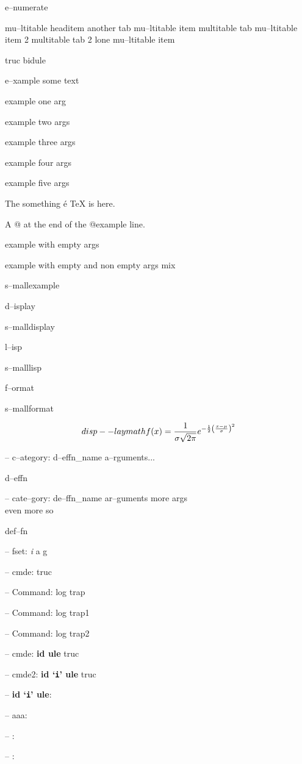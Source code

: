 \documentclass{book}
\begin{document}
e--numerate

mu--ltitable headitem another tab
mu--ltitable item multitable tab
mu--ltitable item 2 multitable tab 2
lone mu--ltitable item

truc bidule

e--xample  some
   text

example one arg

example two args

example three args

example four args

example five args

The something \'{e} \TeX{} is here.

A @ at the end of the @example line.

example with empty args

example with empty and non empty args mix

s--mallexample

d--isplay

s--malldisplay

l--isp

s--malllisp

f--ormat

s--mallformat

$$
disp--laymath
f(x) = {1 \over \sigma \sqrt{2\pi}}e^{-{1 \over 2}\left({x-\mu \over \sigma}\right)^2}
$$

\hbox{}-- c--ategory: d--effn\_name a--rguments...


d--effn

\hbox{}-- cate--gory: de--ffn\_name ar--guments    more args \leavevmode{}\\ even more so


def--fn

\hbox{}-- fset: \emph{i} a g


\hbox{}-- cmde: truc 


\hbox{}-- Command: log trap 


\hbox{}-- Command: log trap1 


\hbox{}-- Command: log trap2 


\hbox{}-- cmde: \textbf{id ule} truc


\hbox{}-- cmde2: \textbf{id `\texttt{i}' ule} truc


\hbox{}-- \textbf{id `\texttt{i}' ule}: 



\hbox{}-- aaa: 


\hbox{}-- : 


\hbox{}-- : 
\end{document}
